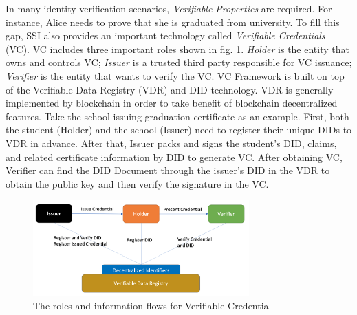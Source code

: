 \documentclass[conference, dvipdfmx]{IEEEtran} %
\begin{document}
\begin{sloppypar}
In many identity verification scenarios, \textit{Verifiable Properties} are required. For instance, Alice needs to prove that she is graduated from university.  To fill this gap, SSI also provides an important technology called \textit{Verifiable Credentials} (VC). VC includes three important roles shown in fig. \ref{fig:vc_framework}. \textit{Holder} is the entity that owns and controls VC; \textit{Issuer} is a trusted third party responsible for VC issuance; \textit{Verifier} is the entity that wants to verify the VC. VC Framework is built on top of the Verifiable Data Registry (VDR) and DID technology. VDR is generally implemented by blockchain in order to take benefit of blockchain decentralized features. Take the school issuing graduation certificate as an example. First, both the student (Holder) and the school (Issuer) need to register their unique DIDs to VDR in advance. After that, Issuer packs and signs the student's DID, claims, and related certificate information by DID to generate VC. After obtaining VC, Verifier can find the DID Document through the issuer's DID in the VDR to obtain the public key and then verify the signature in the VC.


\begin{figure}[ht] %
  \centering  
  \includegraphics[width=83mm]{images/vc_framework.png} %
  \caption{The roles and information flows for Verifiable Credential} %
  \label{fig:vc_framework} %
\end{figure}



\end{sloppypar}
\end{document}
